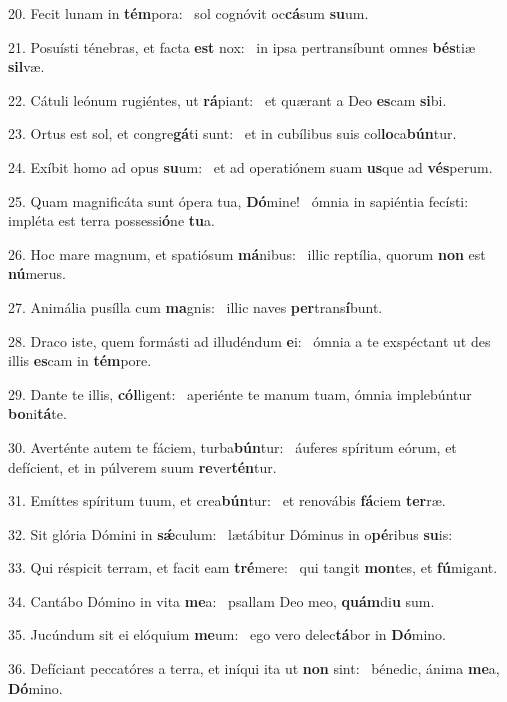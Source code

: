 20. Fecit lunam in \textbf{tém}pora: \ast\  sol cognóvit oc\textbf{cá}sum \textbf{su}um.\

21. Posuísti ténebras, et facta \textbf{est} nox: \ast\  in ipsa pertransíbunt omnes \textbf{bés}tiæ \textbf{sil}væ.\

22. Cátuli leónum rugiéntes, ut \textbf{rá}piant: \ast\  et quærant a Deo \textbf{es}cam \textbf{si}bi.\

23. Ortus est sol, et congre\textbf{gá}ti sunt: \ast\  et in cubílibus suis col\textbf{lo}ca\textbf{bún}tur.\

24. Exíbit homo ad opus \textbf{su}um: \ast\  et ad operatiónem suam \textbf{us}que ad \textbf{vés}perum.\

25. Quam magnificáta sunt ópera tua, \textbf{Dó}mine! \ast\  ómnia in sapiéntia fecísti: impléta est terra possessi\textbf{ó}ne \textbf{tu}a.\

26. Hoc mare magnum, et spatiósum \textbf{má}nibus: \ast\  illic reptília, quorum \textbf{non} est \textbf{nú}merus.\

27. Animália pusílla cum \textbf{ma}gnis: \ast\  illic naves \textbf{per}trans\textbf{í}bunt.\

28. Draco iste, quem formásti ad illudéndum \textbf{e}i: \ast\  ómnia a te exspéctant ut des illis \textbf{es}cam in \textbf{tém}pore.\

29. Dante te illis, \textbf{cól}ligent: \ast\  aperiénte te manum tuam, ómnia implebúntur \textbf{bo}ni\textbf{tá}te.\

30. Averténte autem te fáciem, turba\textbf{bún}tur: \ast\  áuferes spíritum eórum, et defícient, et in púlverem suum \textbf{re}ver\textbf{tén}tur.\

31. Emíttes spíritum tuum, et crea\textbf{bún}tur: \ast\  et renovábis \textbf{fá}ciem \textbf{ter}ræ.\

32. Sit glória Dómini in \textbf{sǽ}culum: \ast\  lætábitur Dóminus in o\textbf{pé}ribus \textbf{su}is:\

33. Qui réspicit terram, et facit eam \textbf{tré}mere: \ast\  qui tangit \textbf{mon}tes, et \textbf{fú}migant.\

34. Cantábo Dómino in vita \textbf{me}a: \ast\  psallam Deo meo, \textbf{quám}di\textbf{u} sum.\

35. Jucúndum sit ei elóquium \textbf{me}um: \ast\  ego vero delec\textbf{tá}bor in \textbf{Dó}mino.\

36. Defíciant peccatóres a terra, et iníqui ita ut \textbf{non} sint: \ast\  bénedic, ánima \textbf{me}a, \textbf{Dó}mino.\

